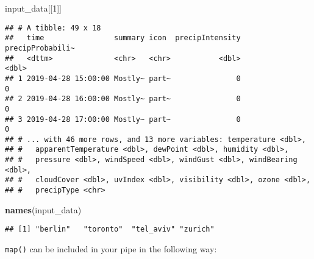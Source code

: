 \documentclass[]{book}
\newenvironment{Shaded}{\begin{snugshade}}{\end{snugshade}}
\newcommand{\DecValTok}[1]{\textcolor[rgb]{0.00,0.00,0.81}{#1}}
\newcommand{\KeywordTok}[1]{\textcolor[rgb]{0.13,0.29,0.53}{\textbf{#1}}}
\newcommand{\NormalTok}[1]{#1}
\newcommand{\OperatorTok}[1]{\textcolor[rgb]{0.81,0.36,0.00}{\textbf{#1}}}
\newcommand{\StringTok}[1]{\textcolor[rgb]{0.31,0.60,0.02}{#1}}
\begin{document}
\begin{Shaded}
\begin{Highlighting}[]
\NormalTok{input_data[[}\DecValTok{1}\NormalTok{]]}
\end{Highlighting}
\end{Shaded}

\begin{verbatim}
## # A tibble: 49 x 18
##   time                summary icon  precipIntensity precipProbabili~
##   <dttm>              <chr>   <chr>           <dbl>            <dbl>
## 1 2019-04-28 15:00:00 Mostly~ part~               0                0
## 2 2019-04-28 16:00:00 Mostly~ part~               0                0
## 3 2019-04-28 17:00:00 Mostly~ part~               0                0
## # ... with 46 more rows, and 13 more variables: temperature <dbl>,
## #   apparentTemperature <dbl>, dewPoint <dbl>, humidity <dbl>,
## #   pressure <dbl>, windSpeed <dbl>, windGust <dbl>, windBearing <dbl>,
## #   cloudCover <dbl>, uvIndex <dbl>, visibility <dbl>, ozone <dbl>,
## #   precipType <chr>
\end{verbatim}

\begin{Shaded}
\begin{Highlighting}[]
\KeywordTok{names}\NormalTok{(input_data)}
\end{Highlighting}
\end{Shaded}

\begin{verbatim}
## [1] "berlin"   "toronto"  "tel_aviv" "zurich"
\end{verbatim}

\texttt{map()} can be included in your pipe in the following way:

\begin{Shaded}
\end{Shaded}
\end{document}
